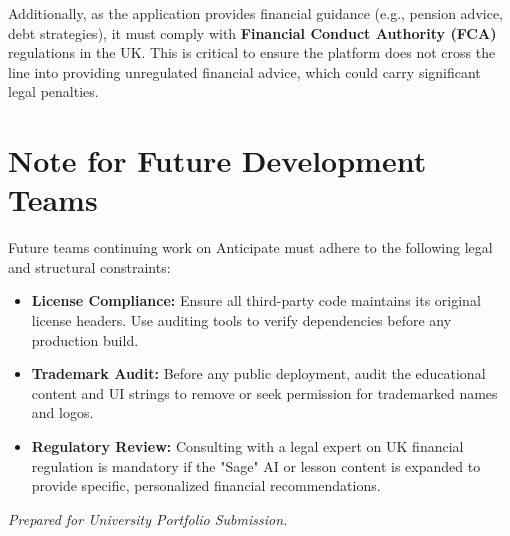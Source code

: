 \documentclass[11pt,a4paper]{article}
\begin{document}
Additionally, as the application provides financial guidance (e.g., pension advice, debt strategies), it must comply with \textbf{Financial Conduct Authority (FCA)} regulations in the UK. This is critical to ensure the platform does not cross the line into providing unregulated financial advice, which could carry significant legal penalties. 

\section{Note for Future Development Teams}
Future teams continuing work on Anticipate must adhere to the following legal and structural constraints:

\begin{itemize}[leftmargin=*]
    \item \textbf{License Compliance:} Ensure all third-party code maintains its original license headers. Use auditing tools to verify dependencies before any production build.
    \item \textbf{Trademark Audit:} Before any public deployment, audit the educational content and UI strings to remove or seek permission for trademarked names and logos.
    \item \textbf{Regulatory Review:} Consulting with a legal expert on UK financial regulation is mandatory if the "Sage" AI or lesson content is expanded to provide specific, personalized financial recommendations.
\end{itemize}

\vfill
\begin{center}
\textit{Prepared for University Portfolio Submission.}
\end{center}
\end{document}
